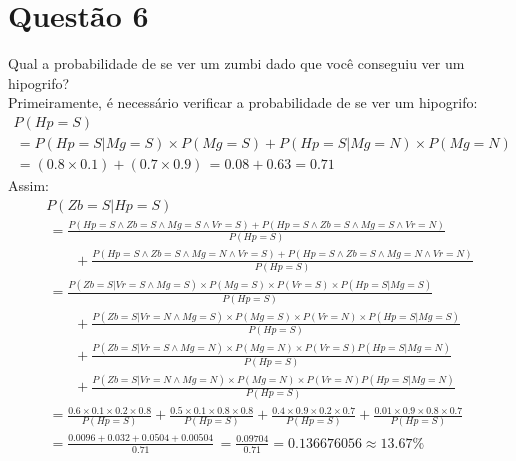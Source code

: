 \documentclass{article}
\begin{document}
    \section*{Questão 6}
        Qual a probabilidade de se ver um zumbi dado que você conseguiu
        ver um hipogrifo? \\
        Primeiramente, é necessário verificar a probabilidade de se ver
        um hipogrifo:
        \begin{gather*}
            P(Hp=S) \\
            \,= P(Hp=S|Mg=S) \times P(Mg=S) + P(Hp=S|Mg=N) \times P(Mg=N) \\
            \,= (0.8 \times 0.1) + (0.7 \times 0.9)
            \,= 0.08 + 0.63 = 0.71
        \end{gather*}
        Assim:
        \begin{gather*}
            P(Zb=S|Hp=S) \\
            \,= \frac{P(Hp=S \land Zb=S \land Mg=S \land Vr=S)
            + P(Hp=S \land Zb=S \land Mg=S \land Vr=N)}{P(Hp=S)} \\
            \qquad+ \frac{P(Hp=S \land Zb=S \land Mg=N \land Vr=S)
            + P(Hp=S \land Zb=S \land Mg=N \land Vr=N)}{P(Hp=S)} \\
            \,= \frac{P(Zb=S|Vr=S \land Mg=S) \times P(Mg=S) \times P(Vr=S)
                \times P(Hp=S|Mg=S)}{P(Hp=S)} \\
            \qquad+ \frac{P(Zb=S|Vr=N \land Mg=S) \times P(Mg=S) \times P(Vr=N)
                \times P(Hp=S|Mg=S)}{P(Hp=S)} \\
            \qquad+ \frac{P(Zb=S|Vr=S \land Mg=N) \times P(Mg=N) \times P(Vr=S)
                P(Hp=S|Mg=N)}{P(Hp=S)} \\
            \qquad+ \frac{P(Zb=S|Vr=N \land Mg=N) \times P(Mg=N) \times P(Vr=N)
                P(Hp=S|Mg=N)}{P(Hp=S)} \\
            \,= \frac{0.6 \times 0.1 \times 0.2 \times 0.8}{P(Hp=S)}
            + \frac{0.5 \times 0.1 \times 0.8 \times 0.8}{P(Hp=S)}
            + \frac{0.4 \times 0.9 \times 0.2 \times 0.7}{P(Hp=S)}
            + \frac{0.01 \times 0.9 \times 0.8 \times 0.7}{P(Hp=S)} \\
            \,= \frac{0.0096 + 0.032 + 0.0504 + 0.00504}{0.71}
            \,= \frac{0.09704}{0.71} = 0.136676056 \approx 13.67\%
        \end{gather*}
\end{document}
